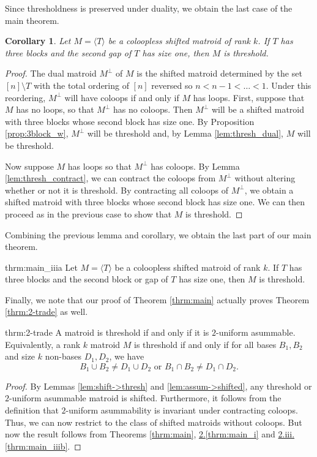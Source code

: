 \documentclass{amsart}
\theoremstyle{definition}
\theoremstyle{plain}
\newtheorem{corollary}[defn]{Corollary}
\begin{document}
Since thresholdness is preserved under duality, we obtain the last case of the main theorem. 

\begin{corollary}
Let $M=\langle T\rangle$ be a coloopless shifted matroid of rank $k$. If $T$ has three blocks and the second gap of $T$ has size one, then $M$ is threshold.
\end{corollary}
\begin{proof}
The dual matroid $M^\perp$ of $M$ is the shifted matroid determined by the set $[n]\setminus T$ with the total ordering of $[n]$ reversed so $n<n-1<\ldots < 1$. Under this reordering, $M^\perp$ will have coloops if and only if $M$ has loops. First, suppose that $M$ has no loops, so that $M^\perp$ has no coloops. Then $M^\perp$ will be a shifted matroid with three blocks whose second block has size one. By Proposition \ref{prop:3block_w}, $M^\perp$ will be threshold and, by Lemma \ref{lem:thresh_dual}, $M$ will be threshold. 

Now suppose $M$ has loops so that $M^\perp$ has coloops. By Lemma \ref{lem:thresh_contract}, we can contract the coloops from $M^\perp$ without altering whether or not it is threshold. By contracting all coloops of $M^\perp$, we obtain a shifted matroid with three blocks whose second block has size one. We can then proceed as in the previous case to show that $M$ is threshold.
\end{proof}

Combining the previous lemma and corollary, we obtain the last part of our main theorem.
\begin{repdoubletheorem}{thrm:main_iiia}
Let $M=\langle T\rangle$ be a coloopless shifted matroid of rank $k$. If $T$ has three blocks and the second block or gap of $T$ has size one, then $M$ is threshold.
\end{repdoubletheorem}

Finally, we note that our proof of Theorem \ref{thrm:main} actually proves Theorem \ref{thrm:2-trade} as well.

\begin{repintrotheorem}{thrm:2-trade}
A matroid is threshold if and only if it is $2$-uniform asummable. Equivalently, a rank $k$ matroid $M$ is threshold if and only if for all bases $B_1,B_2$ and size $k$ non-bases $D_1,D_2$, we have 
\[B_1 \cup B_2 \neq D_1 \cup D_2 \text{ or } B_1\cap B_2 \neq D_1 \cap D_2. \]
\end{repintrotheorem}
\begin{proof}
  By Lemmas \ref{lem:shift->thresh} and \ref{lem:assum->shifted}, any threshold or $2$-uniform asummable matroid is shifted. Furthermore, it follows from the definition that $2$-uniform asummability is invariant under contracting coloops. Thus, we can now restrict to the class of shifted matroids without coloops. But now the result follows from Theorems \ref{thrm:main}, \hyperref[thrm:main_i]{2.\ref*{thrm:main_i}} and \hyperref[thrm:main_iiib]{2.iii.\ref*{thrm:main_iiib}}.
\end{proof}
\end{document}
